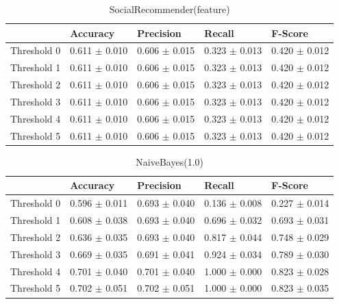 \clearpage
\begin{table}[h]
	\centering
	\begin{tabular}{|l|l|l|l|l|} %
	\hline
	& Accuracy & Precision & Recall & F-Score \\ \hline
	Threshold 0 & 0.611	\( \pm \) 0.010	& 0.606	\( \pm \) 0.015	& 0.323	\( \pm \) 0.013	& 0.420	\( \pm \) 0.012	\\ \hline
	Threshold 1 & 0.611	\( \pm \) 0.010	& 0.606	\( \pm \) 0.015	& 0.323	\( \pm \) 0.013	& 0.420	\( \pm \) 0.012	\\ \hline
	Threshold 2 & 0.611	\( \pm \) 0.010	& 0.606	\( \pm \) 0.015	& 0.323	\( \pm \) 0.013	& 0.420	\( \pm \) 0.012	\\ \hline
	Threshold 3 & 0.611	\( \pm \) 0.010	& 0.606	\( \pm \) 0.015	& 0.323	\( \pm \) 0.013	& 0.420	\( \pm \) 0.012	\\ \hline
	Threshold 4 & 0.611	\( \pm \) 0.010	& 0.606	\( \pm \) 0.015	& 0.323	\( \pm \) 0.013	& 0.420	\( \pm \) 0.012	\\ \hline
	Threshold 5 & 0.611	\( \pm \) 0.010	& 0.606	\( \pm \) 0.015	& 0.323	\( \pm \) 0.013	& 0.420	\( \pm \) 0.012	\\ \hline
	\end{tabular}
	\caption{SocialRecommender(feature)}
	\label{tab:revpol}
\end{table}
\begin{table}[h]
	\centering
	\begin{tabular}{|l|l|l|l|l|} %
	\hline
	& Accuracy & Precision & Recall & F-Score \\ \hline
	Threshold 0 & 0.596	\( \pm \) 0.011	& 0.693	\( \pm \) 0.040	& 0.136	\( \pm \) 0.008	& 0.227	\( \pm \) 0.014	\\ \hline
	Threshold 1 & 0.608	\( \pm \) 0.038	& 0.693	\( \pm \) 0.040	& 0.696	\( \pm \) 0.032	& 0.693	\( \pm \) 0.031	\\ \hline
	Threshold 2 & 0.636	\( \pm \) 0.035	& 0.693	\( \pm \) 0.040	& 0.817	\( \pm \) 0.044	& 0.748	\( \pm \) 0.029	\\ \hline
	Threshold 3 & 0.669	\( \pm \) 0.035	& 0.691	\( \pm \) 0.041	& 0.924	\( \pm \) 0.034	& 0.789	\( \pm \) 0.030	\\ \hline
	Threshold 4 & 0.701	\( \pm \) 0.040	& 0.701	\( \pm \) 0.040	& 1.000	\( \pm \) 0.000	& 0.823	\( \pm \) 0.028	\\ \hline
	Threshold 5 & 0.702	\( \pm \) 0.051	& 0.702	\( \pm \) 0.051	& 1.000	\( \pm \) 0.000	& 0.823	\( \pm \) 0.035	\\ \hline
	\end{tabular}
	\caption{NaiveBayes(1.0)}
	\label{tab:revpol}
\end{table}

